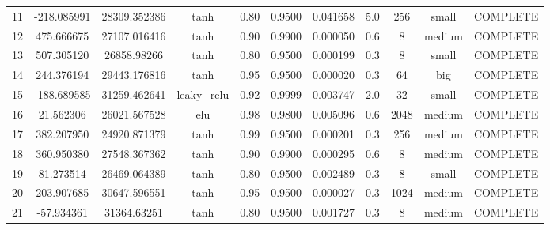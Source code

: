 \begin{longtable}{ccccccccccc}
                       11 &                -218.085991 &                       28309.352386 &            tanh &        0.80 & 0.9500 &       0.041658 &             5.0 &      256 &     small & COMPLETE \\
                       12 &                 475.666675 &                       27107.016416 &            tanh &        0.90 & 0.9900 &       0.000050 &             0.6 &        8 &    medium & COMPLETE \\
                       13 &                 507.305120 &                        26858.98266 &            tanh &        0.80 & 0.9500 &       0.000199 &             0.3 &        8 &     small & COMPLETE \\
                       14 &                 244.376194 &                       29443.176816 &            tanh &        0.95 & 0.9500 &       0.000020 &             0.3 &       64 &       big & COMPLETE \\
                       15 &                -188.689585 &                       31259.462641 &     leaky\_relu &        0.92 & 0.9999 &       0.003747 &             2.0 &       32 &     small & COMPLETE \\
                       16 &                  21.562306 &                       26021.567528 &             elu &        0.98 & 0.9800 &       0.005096 &             0.6 &     2048 &    medium & COMPLETE \\
                       17 &                 382.207950 &                       24920.871379 &            tanh &        0.99 & 0.9500 &       0.000201 &             0.3 &      256 &    medium & COMPLETE \\
                       18 &                 360.950380 &                       27548.367362 &            tanh &        0.90 & 0.9900 &       0.000295 &             0.6 &        8 &    medium & COMPLETE \\
                       19 &                  81.273514 &                       26469.064389 &            tanh &        0.80 & 0.9500 &       0.002489 &             0.3 &        8 &     small & COMPLETE \\
                       20 &                 203.907685 &                       30647.596551 &            tanh &        0.95 & 0.9500 &       0.000027 &             0.3 &     1024 &    medium & COMPLETE \\
                       21 &                 -57.934361 &                        31364.63251 &            tanh &        0.80 & 0.9500 &       0.001727 &             0.3 &        8 &    medium & COMPLETE \\

\end{longtable}

